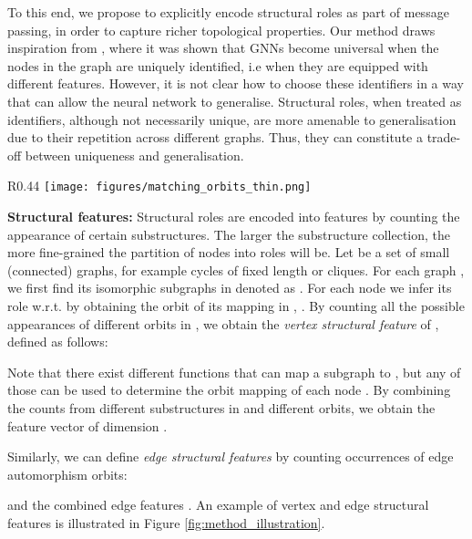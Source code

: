 \documentclass{article} \usepackage{iclr2021_conference,times}
\begin{document}
To this end, we propose to explicitly encode structural roles as part of message passing, in order to capture richer topological properties. Our method draws inspiration from \cite{Loukas2020What}, where it was shown that GNNs become universal when the nodes in the graph are uniquely identified, i.e when they are equipped with different features. However, it is not clear how to choose these identifiers in a way that can allow the neural network to generalise. Structural roles, when treated as identifiers, although not necessarily unique, are more amenable to generalisation due to their repetition across different graphs. Thus, they can constitute a trade-off between uniqueness and generalisation.


\begin{wrapfigure}{R}{0.44\textwidth}\vspace{-3mm}
\centering
      \texttt{[image: figures/matching\_orbits\_thin.png]}
        \captionsetup[figure]{skip=\abovecaptionskip}
      \label{fig:method_illustration}
\end{wrapfigure}

\noindent\textbf{Structural features:} Structural roles are encoded into features by counting the appearance of certain substructures. The larger the substructure collection, the more fine-grained the partition of nodes into roles will be.
Let  be a set of small (connected) graphs, for example cycles of fixed length or cliques.  For each graph , we first find its isomorphic subgraphs in  denoted as . For each node  we infer its role w.r.t.  by obtaining the orbit of its mapping  in , . By counting all the possible appearances of different orbits in , we obtain the {\em vertex structural feature}  of , defined as follows:



Note that there exist  different functions  that can map a subgraph  to , but any of those can be used to determine the orbit mapping of each node .
By combining the counts from different substructures in  and different orbits, we obtain the feature vector 
 of dimension . 

Similarly, we can define {\em edge structural features}  by counting occurrences of edge automorphism orbits:


and the combined edge features . An example of vertex and edge structural features is illustrated in Figure \ref{fig:method_illustration}.
\end{document}
